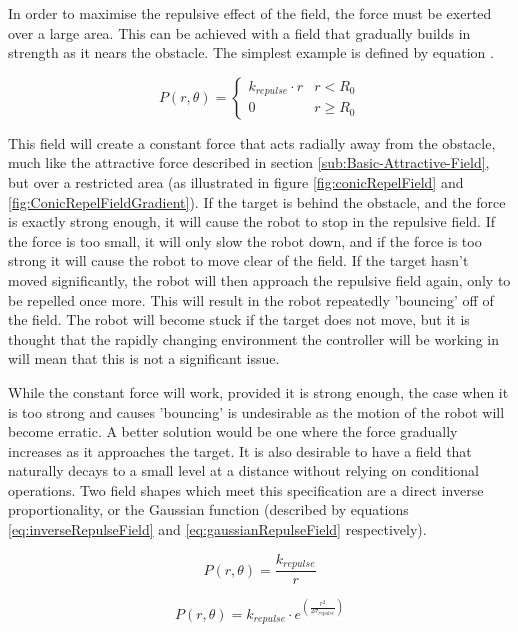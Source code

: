 \documentclass[10pt]{article} \usepackage[a4paper]{geometry}
\begin{document}
In order to maximise the repulsive effect of the field, the force must be
exerted over a large area. This can be achieved with a field that gradually
builds in strength as it nears the obstacle. The simplest example is defined by
equation .

\[
P\left(r,\theta\right)=\begin{cases}
k_{repulse}\cdot r & r<R_{0}\\
0 & r\geq R_{0}
\end{cases}
\]

This field will create a constant force that acts radially away from the
obstacle, much like the attractive force described in section
\ref{sub:Basic-Attractive-Field}, but over a restricted area (as illustrated in
figure \ref{fig:conicRepelField} and \ref{fig:ConicRepelFieldGradient}). If the
target is behind the obstacle, and the force is exactly strong enough, it will
cause the robot to stop in the repulsive field. If the force is too small, it
will only slow the robot down, and if the force is too strong it will cause the
robot to move clear of the field. If the target hasn't moved significantly, the
robot will then approach the repulsive field again, only to be repelled once
more. This will result in the robot repeatedly 'bouncing' off of the field. The
robot will become stuck if the target does not move, but it is thought that the
rapidly changing environment the controller will be working in will mean that
this is not a significant issue.

While the constant force will work, provided it is strong enough, the case when
it is too strong and causes 'bouncing' is undesirable as the motion of the robot
will become erratic. A better solution would be one where the force gradually
increases as it approaches the target. It is also desirable to have a field that
naturally decays to a small level at a distance without relying on conditional
operations. Two field shapes which meet this specification are a direct inverse
proportionality, or the Gaussian function (described by equations
\ref{eq:inverseRepulseField} and \ref{eq:gaussianRepulseField} respectively).

\begin{equation}
P\left(r,\theta\right)=\frac{k_{repulse}}{r}\label{eq:inverseRepulseField}
\end{equation}

\begin{equation}
P\left(r,\theta\right)=k_{repulse}\cdot e^{\left(\frac{r^{2}}{2\sigma_{repulse}}\right)}\label{eq:gaussianRepulseField}
\end{equation}
\end{document}
